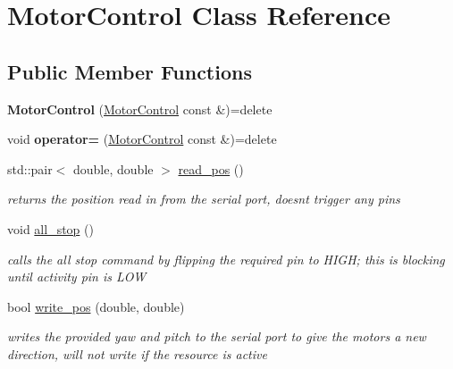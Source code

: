 \hypertarget{structMotorControl}{}\section{Motor\+Control Class Reference}
\label{structMotorControl}
\subsection*{Public Member Functions}
\begin{DoxyCompactItemize}
\item 
\mbox{\label{structMotorControl_acaead1ae076590ce6a403658d94598ab}} 
{\bfseries Motor\+Control} (\mbox{\hyperlink{structMotorControl}{Motor\+Control}} const \&)=delete
\item 
\mbox{\label{structMotorControl_a372ffb76326e3ac4fa825ed39536ee08}} 
void {\bfseries operator=} (\mbox{\hyperlink{structMotorControl}{Motor\+Control}} const \&)=delete
\item 
std\+::pair$<$ double, double $>$ \mbox{\hyperlink{structMotorControl_ace9edcee1a69c1d56e2af842e2fd3b1a}{read\+\_\+pos}} ()
\begin{DoxyCompactList}\small\item\em returns the position read in from the serial port, doesn\textquotesingle{}t trigger any pins \end{DoxyCompactList}\item 
\mbox{\label{structMotorControl_a16f947c331b12ae98e11f67ae1b4229d}} 
void \mbox{\hyperlink{structMotorControl_a16f947c331b12ae98e11f67ae1b4229d}{all\+\_\+stop}} ()
\begin{DoxyCompactList}\small\item\em calls the all stop command by flipping the required pin to H\+I\+GH; this is blocking until activity pin is L\+OW \end{DoxyCompactList}\item 
bool \mbox{\hyperlink{structMotorControl_a2027a3374ee4ec606901c77931226e30}{write\+\_\+pos}} (double, double)
\begin{DoxyCompactList}\small\item\em writes the provided yaw and pitch to the serial port to give the motors a new direction, will not write if the resource is active \end{DoxyCompactList}\item 

\end{DoxyCompactItemize}
